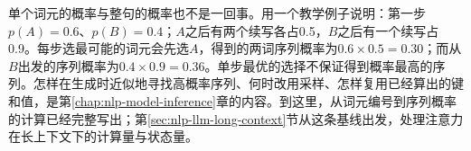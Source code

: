 单个词元的概率与整句的概率也不是一回事。用一个教学例子说明：第一步$p(A)=0.6$、$p(B)=0.4$；$A$之后有两个续写各占0.5，$B$之后有一个续写占0.9。每步选最可能的词元会先选$A$，得到的两词序列概率为$0.6\times0.5=0.30$；而从$B$出发的序列概率为$0.4\times0.9=0.36$。单步最优的选择不保证得到概率最高的序列。怎样在生成时近似地寻找高概率序列、何时改用采样、怎样复用已经算出的键和值，是第\ref{chap:nlp-model-inference}章的内容。到这里，从词元编号到序列概率的计算已经完整写出；第\ref{sec:nlp-llm-long-context}节从这条基线出发，处理注意力在长上下文下的计算量与状态量。
